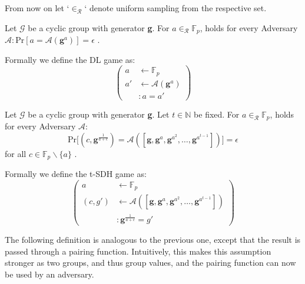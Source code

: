 From now on let `$\in_{\mathcal{R}}$` denote uniform sampling from the respective set. 

\begin{definition}
    \label{DL_def}
    Let $\mathcal{G}$ be a cyclic group with generator \textbf{g}.
    For $a \in_{\mathcal{R}} \mathbb{F}_p$, holds for every Adversary $\mathcal{A}: \text{Pr}[a = \mathcal{A}(\textbf{g}^a)] = \epsilon$ \parencite{KZG}.

    Formally we define the DL game as: 
    \begin{equation*}
        \left(
            \begin{aligned}
                a & \leftarrow \mathbb{F}_p \\
                a' & \leftarrow \mathcal{A}(\textbf{g}^a) \\
                & : a = a'
            \end{aligned}
        \right)
    \end{equation*}
\end{definition}

\begin{definition}
    \label{tSDH_def}
    Let $\mathcal{G}$ be a cyclic group with generator \textbf{g}.
    Let $t \in \mathbb{N}$ be fixed.  For $a \in_{\mathcal{R}} \mathbb{F}_p$, holds for every Adversary $\mathcal{A}:$
    \begin{equation*}
        \text{Pr}\big[
            (c,\textbf{g}^{\frac{1}{a+c}}) = \mathcal{A}([\textbf{g},\textbf{g}^a,\textbf{g}^{a^2},\dots, \textbf{g}^{a^{t-1}}])
        \big] = \epsilon
    \end{equation*}
    for all $c \in \mathbb{F}_p\backslash \{a\}$ \parencite{KZG}.
    
    Formally we define the t-SDH game as: 
    \begin{equation*}
        \left(
            \begin{aligned}
                a & \leftarrow \mathbb{F}_p \\
                (c,g') & \leftarrow \mathcal{A}([\textbf{g},\textbf{g}^a,\textbf{g}^{a^2},\dots, \textbf{g}^{a^{t-1}}]) \\
                & : \textbf{g}^{\frac{1}{a+c}} = g'
            \end{aligned}
        \right)
    \end{equation*}
\end{definition}

The following definition is analogous to the previous one, except that the result is passed through a pairing function. Intuitively, this makes this assumption stronger as two groups, and thus group values, and the pairing function can now be used by an adversary.

